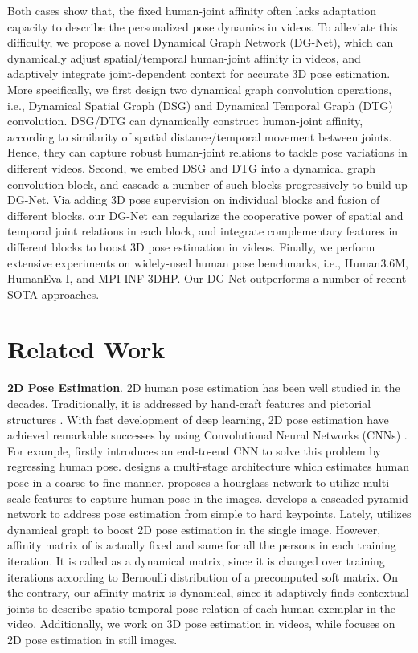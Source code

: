 \documentclass[journal]{IEEEtran}
\begin{document}
Both cases show that,
the fixed human-joint affinity often lacks adaptation capacity to describe the personalized pose dynamics in videos.
To alleviate this difficulty,
we propose a novel Dynamical Graph Network (DG-Net),
which can dynamically adjust spatial/temporal human-joint affinity in videos,
and adaptively integrate joint-dependent context for accurate 3D pose estimation.
More specifically,
we first design two dynamical graph convolution operations,
i.e.,
Dynamical Spatial Graph (DSG) and Dynamical Temporal Graph (DTG) convolution.
DSG/DTG can dynamically construct human-joint affinity,
according to similarity of spatial distance/temporal movement between joints.
Hence,
they can capture robust human-joint relations to tackle pose variations in different videos.
Second,
we embed DSG and DTG into a dynamical graph convolution block,
and cascade a number of such blocks progressively to build up DG-Net.
Via adding 3D pose supervision on individual blocks and fusion of different blocks,
our DG-Net can regularize the cooperative power of spatial and temporal joint relations in each block,
and integrate complementary features in different blocks to boost 3D pose estimation in videos.
Finally,
we perform extensive experiments on widely-used human pose benchmarks,
i.e.,
Human3.6M,
HumanEva-I,
and
MPI-INF-3DHP.
Our DG-Net outperforms a number of recent SOTA approaches.



\section{Related Work}

\textbf{2D Pose Estimation}.
2D human pose estimation has been well studied in the decades.
Traditionally,
it is addressed by hand-craft features and pictorial structures \cite{dantone2013human}.
With fast development of deep learning,
2D pose estimation have achieved remarkable successes by using Convolutional Neural Networks (CNNs) \cite{wei2016convolutional,toshev2014deeppose,cpn,hourglass}.
For example,
\cite{toshev2014deeppose} firstly introduces an end-to-end CNN to solve this problem by regressing human pose.
\cite{wei2016convolutional} designs a multi-stage architecture which estimates human pose in a coarse-to-fine manner.
\cite{hourglass} proposes a hourglass network to utilize multi-scale features to capture human pose in the images.
\cite{cpn} develops a cascaded pyramid network to address pose estimation from simple to hard keypoints.
Lately,
\cite{qiu2020dgcn} utilizes dynamical graph to boost 2D pose estimation in the single image.
However,
affinity matrix of \cite{qiu2020dgcn} is actually fixed and same for all the persons in each training iteration.
It is called as a dynamical matrix,
since it is changed over training iterations according to Bernoulli distribution of a precomputed soft matrix.
On the contrary,
our affinity matrix is dynamical,
since it adaptively finds contextual joints to describe spatio-temporal pose relation of each human exemplar in the video.
Additionally,
we work on 3D pose estimation in videos,
while
\cite{qiu2020dgcn} focuses on 2D pose estimation in still images.
\end{document}
